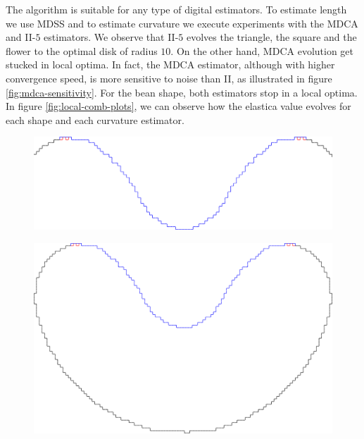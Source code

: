 The algorithm is suitable for any type of digital estimators. To estimate length we use MDSS and to estimate curvature we execute experiments with the MDCA and II-$5$ estimators. We observe that II-$5$ evolves the triangle, the square and the flower to the optimal disk of radius $10$. On the other hand, MDCA evolution get stucked in local optima. In fact, the MDCA estimator, although with higher convergence speed, is more sensitive to noise than II, as illustrated in figure \ref{fig:mdca-sensitivity}. For the bean shape, both estimators stop in a local optima. In figure \ref{fig:local-comb-plots}, we can observe how the elastica value evolves for each shape and each curvature estimator.








\begin{figure}[h!]
\begin{minipage}[b]{0.6\textwidth}
\center
\includegraphics[scale=0.15]{figures/chapter5/mdca-sensitivity/closer-picture.pdf}
\end{minipage}%
\begin{minipage}[b]{0.4\textwidth}
\center
\includegraphics[scale=0.025]{figures/chapter5/mdca-sensitivity/big-picture.pdf}\\\vspace{2em}

\end{minipage}
\end{figure}
